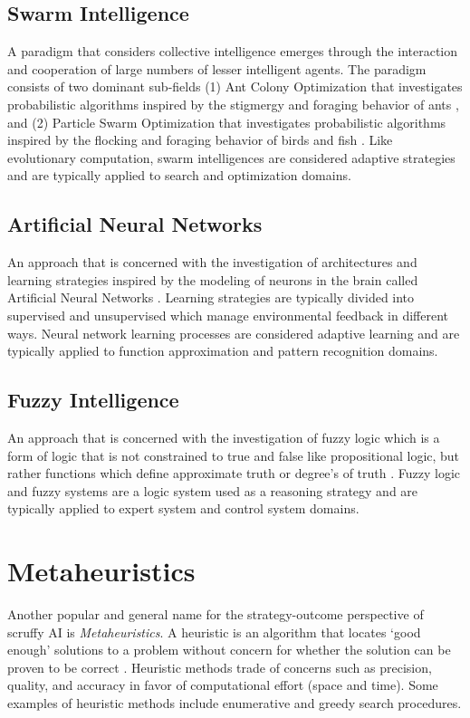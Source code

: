 \documentclass[a4paper, 11pt]{article}
\begin{document}
\subsection{Swarm Intelligence} 
A paradigm that considers collective intelligence emerges through the interaction and cooperation of large numbers of lesser intelligent agents. The paradigm consists of two dominant sub-fields (1) Ant Colony Optimization that investigates probabilistic algorithms inspired by the stigmergy and foraging behavior of ants \cite{Bonabeau1999, Dorigo2004}, and (2) Particle Swarm Optimization that investigates probabilistic algorithms inspired by the flocking and foraging behavior of birds and fish \cite{Shi2001}. Like evolutionary computation, swarm intelligences are considered adaptive strategies and are typically applied to search and optimization domains.

\subsection{Artificial Neural Networks}
An approach that is concerned with the investigation of architectures and learning strategies inspired by the modeling of neurons in the brain called Artificial Neural Networks \cite{Bishop1995}. Learning strategies are typically divided into supervised and unsupervised which manage environmental feedback in different ways. Neural network learning processes are considered adaptive learning and are typically applied to function approximation and pattern recognition domains.

\subsection{Fuzzy Intelligence}
An approach that is concerned with the investigation of fuzzy logic which is a form of logic that is not constrained to true and false like propositional logic, but rather functions which define approximate truth or degree’s of truth \cite{Zadeh1996}. Fuzzy logic and fuzzy systems are a logic system used as a reasoning strategy and are typically applied to expert system and control system domains.

% 
% 
\section{Metaheuristics}
\label{sec:metaheuristics}
Another popular and general name for the strategy-outcome perspective of scruffy AI is \emph{Metaheuristics}. 
A heuristic is an algorithm that locates `good enough' solutions to a problem without concern for whether the solution can be proven to be correct \cite{Michalewicz2004}. Heuristic methods trade of concerns such as precision, quality, and accuracy in favor of computational effort (space and time). Some examples of heuristic methods include enumerative and greedy search procedures.
\end{document}

